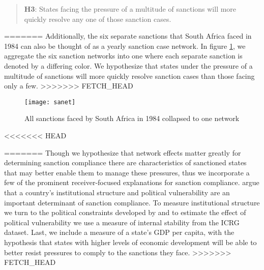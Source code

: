 
\begin{quote}
	\textbf{H3}: States facing the pressure of a multitude of sanctions will more quickly resolve any one of those sanction cases.
\end{quote}
=======
Additionally, the six separate sanctions that South Africa faced in 1984 can also be thought of as a yearly sanction case network. In figure \ref{fig:sanet}, we aggregate the six sanction networks into one where each separate sanction is denoted by a differing color. We hypothesize that states under the pressure of a multitude of sanctions will more quickly resolve sanction cases than those facing only a few.
>>>>>>> FETCH_HEAD

\begin{figure}[ht]
	\centering
	\texttt{[image: sanet]}
	\caption{All sanctions faced by South Africa in 1984 collapsed to one network}
	\label{fig:sanet}
\end{figure}
\FloatBarrier

<<<<<<< HEAD



=======
Though we hypothesize that network effects matter greatly for determining sanction compliance there are characteristics of sanctioned states that may better enable them to manage these pressures, thus we incorporate a few of the prominent receiver-focused explanations for sanction compliance. \citet{bolks2000} argue that a country's institutional structure and political vulnerability are an important determinant of sanction compliance. To measure institutional structure we turn to the political constraints developed by \citet{henisz2000a} and to estimate the effect of political vulnerability we use a measure of internal stability from the ICRG dataset. Last, we include a measure of a state's GDP per capita, with the hypothesis that states with higher levels of economic development will be able to better resist pressures to comply to the sanctions they face.
>>>>>>> FETCH_HEAD

